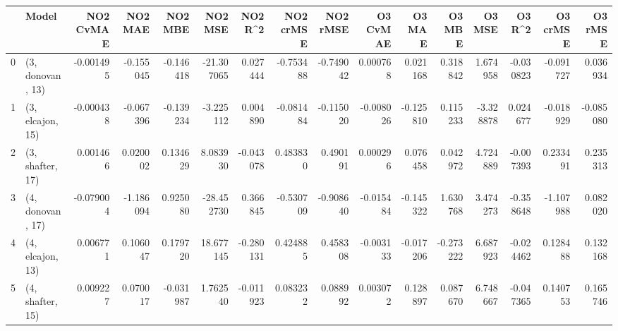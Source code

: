 \begin{tabular}{llrrrrrrrrrrrrrr}
\toprule
{} &             Model &  NO2 CvMAE &   NO2 MAE &   NO2 MBE &    NO2 MSE &   NO2 R\textasciicircum2 &  NO2 crMSE &  NO2 rMSE &  O3 CvMAE &    O3 MAE &    O3 MBE &    O3 MSE &    O3 R\textasciicircum2 &  O3 crMSE &   O3 rMSE \\
\midrule
0 &  (3, donovan, 13) &  -0.001495 & -0.155045 & -0.146418 & -21.307065 &  0.027444 &  -0.753488 & -0.749042 &  0.000768 &  0.021168 &  0.318842 &  1.674958 & -0.030823 & -0.091727 &  0.036934 \\
1 &  (3, elcajon, 15) &  -0.000438 & -0.067396 & -0.139234 &  -3.225112 &  0.004890 &  -0.081484 & -0.115020 & -0.008026 & -0.125810 &  0.115233 & -3.328878 &  0.024677 & -0.018929 & -0.085080 \\
2 &  (3, shafter, 17) &   0.001466 &  0.020002 &  0.134629 &   8.083930 & -0.043078 &   0.483830 &  0.490191 &  0.000296 &  0.076458 &  0.042972 &  4.724889 & -0.007393 &  0.233491 &  0.235313 \\
3 &  (4, donovan, 17) &  -0.079004 & -1.186094 &  0.925080 & -28.452730 &  0.366845 &  -0.530709 & -0.908640 & -0.015484 & -0.145322 &  1.630768 &  3.474273 & -0.358648 & -1.107988 &  0.082020 \\
4 &  (4, elcajon, 13) &   0.006771 &  0.106047 &  0.179720 &  18.677145 & -0.280131 &   0.424885 &  0.458308 & -0.003133 & -0.017206 & -0.273222 &  6.687923 & -0.024462 &  0.128488 &  0.132168 \\
5 &  (4, shafter, 15) &   0.009227 &  0.070017 & -0.031987 &   1.762540 & -0.011923 &   0.083232 &  0.088992 &  0.003072 &  0.128897 &  0.087670 &  6.748667 & -0.047365 &  0.140753 &  0.165746 \\
\bottomrule
\end{tabular}
